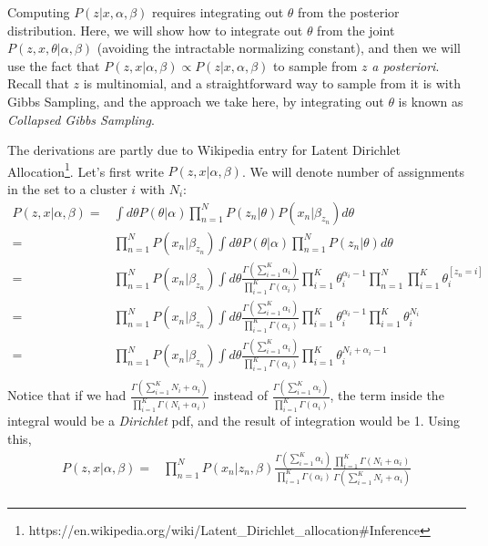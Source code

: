 \documentclass{article}%
\begin{document}
Computing $P(z|x, \alpha, \beta)$ requires integrating out $\theta$ from the posterior distribution. Here, we will show how to integrate out $\theta$ from the joint  $P(z, x, \theta|\alpha, \beta)$ (avoiding the intractable normalizing constant), and then we will use the fact that $P(z, x|\alpha, \beta) \propto P(z|x, \alpha, \beta)$ to sample from $z$ \textit{a posteriori}. Recall that $z$ is multinomial, and a straightforward way to sample from it is with Gibbs Sampling, and the approach we take here, by integrating out $\theta$ is known as \textit{Collapsed Gibbs Sampling}.

The derivations are partly due to Wikipedia entry for Latent Dirichlet Allocation\footnote{https://en.wikipedia.org/wiki/Latent\_Dirichlet\_allocation\#Inference}. Let's first write $P(z, x|\alpha, \beta)$. We will denote number of assignments in the set to a cluster $i$ with $N_i$:
\begin{align*}
P(z, x|\alpha, \beta) =& \int d\theta P(\theta|\alpha) \prod_{n=1}^{N} P(z_n |\theta) P(x_n|\beta_{z_n}) d\theta\\
=&  \prod_{n=1}^{N} P(x_n|\beta_{z_n})  \int d\theta P(\theta|\alpha) \prod_{n=1}^{N} P(z_n |\theta) d\theta\\
=&  \prod_{n=1}^{N} P(x_n|\beta_{z_n}) \int d\theta \frac{\Gamma(\sum_{i=1}^K \alpha_i)}{\prod_{i=1}^K \Gamma(\alpha_i)}  \prod_{i=1}^K\theta_i^{\alpha_i - 1} \prod_{n=1}^N \prod_{i=1}^K \theta_i^{[z_n = i]}\\
=& \prod_{n=1}^{N} P(x_n|\beta_{z_n})   \int d\theta \frac{\Gamma(\sum_{i=1}^K \alpha_i)}{\prod_{i=1}^K \Gamma(\alpha_i)} \prod_{i=1}^K\theta_i^{\alpha_i - 1} \prod_{i=1}^K \theta_i^{N_i}\\
=& \prod_{n=1}^{N} P(x_n|\beta_{z_n})  \int d\theta \frac{\Gamma(\sum_{i=1}^K \alpha_i)}{\prod_{i=1}^K \Gamma(\alpha_i)}  \prod_{i=1}^K \theta_i^{N_i + \alpha_i -1}\\
\end{align*}
Notice that if we had $\frac{\Gamma(\sum_{i=1}^K N_i + \alpha_i)}{\prod_{i=1}^K \Gamma(N_i + \alpha_i)}$ instead of $\frac{\Gamma(\sum_{i=1}^K \alpha_i)}{\prod_{i=1}^K \Gamma(\alpha_i)}$, the term inside the integral would be a \textit{Dirichlet} pdf, and the result of integration would be 1. Using this, 
\begin{align*}
P(z, x|\alpha, \beta) =& \prod_{n=1}^{N} P(x_n|z_n, \beta) \frac{\Gamma(\sum_{i=1}^K \alpha_i)}{\prod_{i=1}^K \Gamma(\alpha_i)}  \frac{\prod_{i=1}^K \Gamma(N_i + \alpha_i)}{\Gamma(\sum_{i=1}^K N_i + \alpha_i)}\\
\end{align*}
\end{document}
